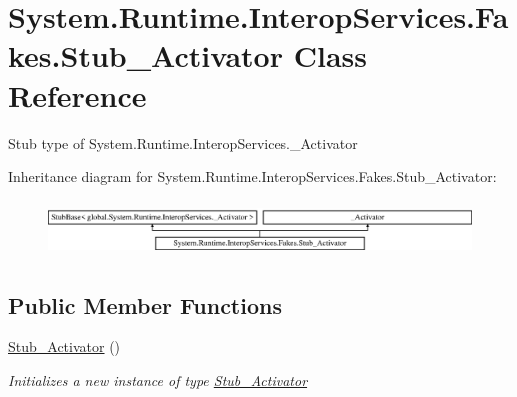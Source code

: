 \hypertarget{class_system_1_1_runtime_1_1_interop_services_1_1_fakes_1_1_stub___activator}{\section{System.\-Runtime.\-Interop\-Services.\-Fakes.\-Stub\-\_\-\-Activator Class Reference}
\label{class_system_1_1_runtime_1_1_interop_services_1_1_fakes_1_1_stub___activator}
}


Stub type of System.\-Runtime.\-Interop\-Services.\-\_\-\-Activator 


Inheritance diagram for System.\-Runtime.\-Interop\-Services.\-Fakes.\-Stub\-\_\-\-Activator\-:\begin{figure}[H]
\begin{center}
\leavevmode
\includegraphics[height=1.481482cm]{class_system_1_1_runtime_1_1_interop_services_1_1_fakes_1_1_stub___activator}
\end{center}
\end{figure}
\subsection*{Public Member Functions}
\begin{DoxyCompactItemize}
\item 
\hyperlink{class_system_1_1_runtime_1_1_interop_services_1_1_fakes_1_1_stub___activator_a984137158af5e6d43b12aa9f84720f07}{Stub\-\_\-\-Activator} ()
\begin{DoxyCompactList}\small\item\em Initializes a new instance of type \hyperlink{class_system_1_1_runtime_1_1_interop_services_1_1_fakes_1_1_stub___activator}{Stub\-\_\-\-Activator}\end{DoxyCompactList}\end{DoxyCompactItemize}
